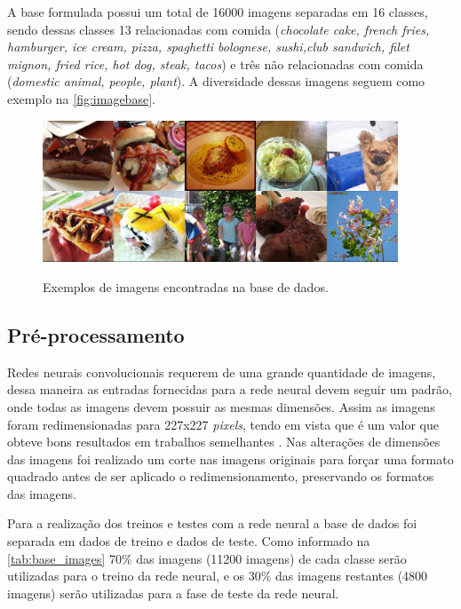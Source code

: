\par A base formulada possui um total de 16000 imagens separadas em 16 classes, sendo dessas classes 13  relacionadas com comida (\textit{chocolate cake, french fries, hamburger, ice cream, pizza, spaghetti bolognese, sushi,club sandwich, filet mignon, fried rice, hot dog, steak, tacos}) e três não relacionadas com comida (\textit{domestic animal, people, plant}). A diversidade dessas imagens seguem como exemplo na \autoref{fig:imagebase}.
\begin{figure}[H]
  \centering
  \caption{Exemplos de imagens encontradas na base de dados.}
  \includegraphics[width=300pt]{dados/figuras/imagembase}
  \label{fig:imagebase}
\end{figure}


\subsection{Pré-processamento}
\par Redes neurais convolucionais requerem de uma grande quantidade de imagens, dessa maneira as entradas fornecidas para a rede neural devem seguir um padrão, onde todas as imagens devem possuir as mesmas dimensões. Assim as imagens foram redimensionadas para 227x227 \textit{pixels}, tendo em vista que é um valor que obteve bons resultados em trabalhos semelhantes \cite{imaginetArticle}. Nas alterações de dimensões das imagens foi realizado um corte nas imagens originais para forçar uma formato quadrado antes de ser aplicado o redimensionamento, preservando os formatos das imagens.
\par Para a realização dos treinos e testes com a rede neural a base de dados foi separada em dados de treino e dados de teste. Como informado na \autoref{tab:base_images} 70\% das imagens (11200 imagens) de cada classe serão utilizadas para o treino da rede neural, e os 30\% das imagens restantes (4800 imagens) serão utilizadas para a fase de teste da rede neural.

